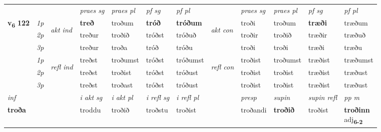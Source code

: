 \begin{longtable}[l]{X>{\footnotesize\itshape}llXXXXlXXXX}
 & &   & \textit{praes sg}  & \textit{praes pl}    & \textit{ pf sg} & \textit{pf pl} & & \textit{praes sg}  & \textit{praes pl}    & \textit{pf sg} & \textit{pf pl }  \\ \cmidrule{4-7} \cmidrule{9-12}
 \multirow{2}{*}{{{\textbf{v{\textsubscript{6}}} \Large{\textbf{122}}}}}  & 1p & \multirow{3}{*}{\begin{turn}{90}\textit{akt ind}\end{turn}} & \textbf{treð} & troðum & \textbf{tróð} & \textbf{tróðum} & \multirow{3}{*}{\begin{turn}{90}\textit{akt con}\end{turn}} &troði & troðum & \textbf{træði} & træðum\\*
 & 2p &  &  treður  & troðið & tróðst & tróðuð & & troðir & troðið & træðir & træðuð \\*
 & 3p &  & treður & troða & tróð & tróðu & & troði & troði& træði & træðu \\*
\cmidrule{4-7} \cmidrule{9-12}
 & 1p & \multirow{3}{*}{\begin{turn}{90}\textit{refl ind}\end{turn}}  & treðst & troðumst & tróðst & tróðumst & \multirow{3}{*}{\begin{turn}{90}\textit{refl con}\end{turn}}  &troðist & troðumst & træðist & træðumst \\*
 & 2p &  & treðst & troðist & tróðst & tróðust & &troðist & troðist & træðist & træðust \\*
 & 3p  & & treðst & troðast & tróðst & tróðust & & troðist & troðist& træðist & træðust \\*
\cmidrule{4-7} \cmidrule{9-12}

   {\textit{inf}} & &  & \textit{i akt sg} & \textit{i akt pl} & \textit{i refl sg} & \textit{i refl pl} && \textit{presp} & \textit{supin} & \textit{supin refl} & \textit{pp m} \\*
  {\textbf{troða}} & && troddu  & troðið & troðstu & troðist && troðandi &  \textbf{troðið} & troðist & \specialcell{\textbf{troðinn} \\ adj\textbf{\textsubscript{6-2}}} \\*

\midrule


\end{longtable}
